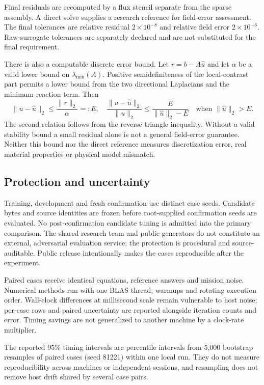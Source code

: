 \documentclass[11pt,letterpaper]{article}
\begin{document}
Final residuals are recomputed by a flux stencil separate from the sparse assembly. A direct solve supplies a research reference for field-error assessment. The final tolerances are relative residual $2\times10^{-8}$ and relative field error $2\times10^{-6}$. Raw-surrogate tolerances are separately declared and are not substituted for the final requirement.

There is also a computable discrete error bound. Let $r=b-A\widehat u$ and let $\alpha$ be a valid lower bound on $\lambda_{\min}(A)$. Positive semidefiniteness of the local-contrast part permits a lower bound from the two directional Laplacians and the minimum reaction term. Then
\begin{equation}
 \|u-\widehat u\|_2\leq\frac{\|r\|_2}{\alpha}=:E,
 \quad
 \frac{\|u-\widehat u\|_2}{\|u\|_2}
 \leq\frac{E}{\|\widehat u\|_2-E}
 \quad\text{when }\|\widehat u\|_2>E.
 \label{eq:bound}
\end{equation}
The second relation follows from the reverse triangle inequality. Without a valid stability bound a small residual alone is not a general field-error guarantee. Neither this bound nor the direct reference measures discretization error, real material properties or physical model mismatch.\citep{pymor_coercive_2026}

\subsection{Protection and uncertainty}

Training, development and fresh confirmation use distinct case seeds. Candidate bytes and source identities are frozen before root-supplied confirmation seeds are evaluated. No post-confirmation candidate tuning is admitted into the primary comparison. The shared research team and public generators do not constitute an external, adversarial evaluation service; the protection is procedural and source-auditable. Public release intentionally makes the cases reproducible after the experiment.

Paired cases receive identical equations, reference answers and mission noise. Numerical methods run with one BLAS thread, warmups and rotating execution order. Wall-clock differences at millisecond scale remain vulnerable to host noise; per-case rows and paired uncertainty are reported alongside iteration counts and error. Timing savings are not generalized to another machine by a clock-rate multiplier.

The reported 95\% timing intervals are percentile intervals from 5,000 bootstrap resamples of paired cases (seed 81221) within one local run. They do not measure reproducibility across machines or independent sessions, and resampling does not remove host drift shared by several case pairs.
\end{document}
